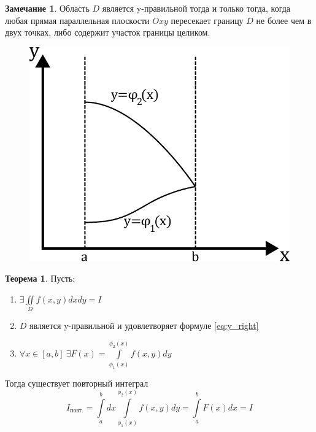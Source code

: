 \documentclass[a4paper, 14pt]{report}
\theoremstyle{definition}
\newtheorem*{note}{Замечание}
\newtheorem*{theorem}{Теорема}
\begin{document}
		\begin{note}
			Область $D$ является y-правильной тогда и только тогда, когда любая прямая параллельная плоскости $Oxy$ пересекает границу $D$ не более чем в двух точках, либо содержит участок границы целиком.
		\end{note}
		
		\begin{figure}[!ht]
			\centering
			\includegraphics{y_right}
			\caption{}
			\label{fig:y_right}
		\end{figure}
		
		\begin{theorem}
			Пусть:
			\begin{enumerate}
				\item $\exists\iint\limits_D f(x, y)dxdy=I$
				\item $D$ является y-правильной и удовлетворяет формуле \ref{eq:y_right}
				\item $\forall x\in[a,b]~\exists F(x)=\int\limits_{\phi_1(x)}^{\phi_2(x)}f(x,y)dy$
			\end{enumerate}
			
			Тогда существует повторный интеграл
			\begin{equation}
				I_{\text{повт.}}
				=\int\limits_a^bdx \int\limits_{\phi_1(x)}^{\phi_2(x)}f(x,y)dy
				=\int\limits_a^bF(x)dx
				=I
			\end{equation}
		\end{theorem}
		
\end{document}
